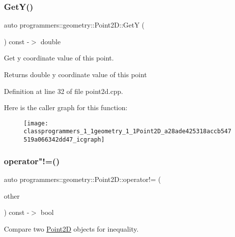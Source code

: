 \subsubsection{\texorpdfstring{Get\+Y()}{GetY()}}
{\footnotesize\ttfamily auto programmers\+::geometry\+::\+Point2\+D\+::\+GetY (\begin{DoxyParamCaption}{ }\end{DoxyParamCaption}) const -\/$>$ double}



Get y coordinate value of this point. 

\begin{DoxyReturn}{Returns}
double y coordinate value of this point 
\end{DoxyReturn}


Definition at line 32 of file point2d.\+cpp.

Here is the caller graph for this function\+:\nopagebreak
\begin{figure}[H]
\begin{center}
\leavevmode
\texttt{[image: classprogrammers\_1\_1geometry\_1\_1Point2D\_a28ade425318accb547519a066342dd47\_icgraph]}
\end{center}
\end{figure}
\mbox{\label{classprogrammers_1_1geometry_1_1Point2D_a14191b6d9b9b360390a36363c7d3569e}} 
\subsubsection{\texorpdfstring{operator"!=()}{operator!=()}}
{\footnotesize\ttfamily auto programmers\+::geometry\+::\+Point2\+D\+::operator!= (\begin{DoxyParamCaption}\item[{const \hyperlink{classprogrammers_1_1geometry_1_1Point2D}{Point2D} \&}]{other }\end{DoxyParamCaption}) const -\/$>$  bool}



Compare two \hyperlink{classprogrammers_1_1geometry_1_1Point2D}{Point2D} objects for inequality. 


